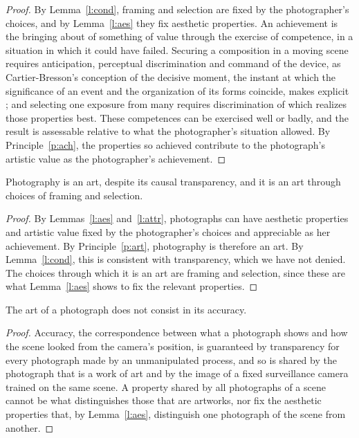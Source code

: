 \documentclass{situationist-preprint}
\begin{document}
\begin{proof}
By Lemma~\ref{l:cond}, framing and selection are fixed by the photographer's choices, and by Lemma~\ref{l:aes} they fix aesthetic properties. An achievement is the bringing about of something of value through the exercise of competence, in a situation in which it could have failed. Securing a composition in a moving scene requires anticipation, perceptual discrimination and command of the device, as Cartier-Bresson's conception of the decisive moment, the instant at which the significance of an event and the organization of its forms coincide, makes explicit \citep{CartierBresson1952}; and selecting one exposure from many requires discrimination of which realizes those properties best. These competences can be exercised well or badly, and the result is assessable relative to what the photographer's situation allowed. By Principle~\ref{p:ach}, the properties so achieved contribute to the photograph's artistic value as the photographer's achievement.
\end{proof}

\begin{theorem}\label{t:main}
Photography is an art, despite its causal transparency, and it is an art through choices of framing and selection.
\end{theorem}

\begin{proof}
By Lemmas~\ref{l:aes} and~\ref{l:attr}, photographs can have aesthetic properties and artistic value fixed by the photographer's choices and appreciable as her achievement. By Principle~\ref{p:art}, photography is therefore an art. By Lemma~\ref{l:cond}, this is consistent with transparency, which we have not denied. The choices through which it is an art are framing and selection, since these are what Lemma~\ref{l:aes} shows to fix the relevant properties.
\end{proof}

\begin{corollary}\label{c:acc}
The art of a photograph does not consist in its accuracy.
\end{corollary}

\begin{proof}
Accuracy, the correspondence between what a photograph shows and how the scene looked from the camera's position, is guaranteed by transparency for every photograph made by an unmanipulated process, and so is shared by the photograph that is a work of art and by the image of a fixed surveillance camera trained on the same scene. A property shared by all photographs of a scene cannot be what distinguishes those that are artworks, nor fix the aesthetic properties that, by Lemma~\ref{l:aes}, distinguish one photograph of the scene from another.
\end{proof}
\end{document}
